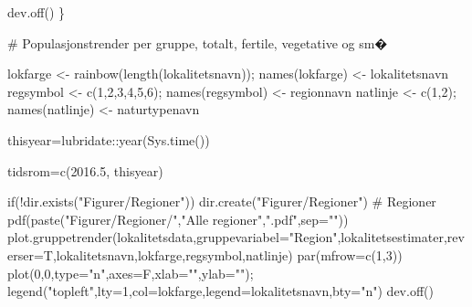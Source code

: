 \documentclass[
  letterpaper,
  DIV=11,
  numbers=noendperiod]{scrreport}
\newenvironment{Shaded}{\begin{snugshade}}{\end{snugshade}}
\newcommand{\AttributeTok}[1]{\textcolor[rgb]{0.40,0.45,0.13}{#1}}
\newcommand{\CommentTok}[1]{\textcolor[rgb]{0.37,0.37,0.37}{#1}}
\newcommand{\ControlFlowTok}[1]{\textcolor[rgb]{0.00,0.23,0.31}{#1}}
\newcommand{\DecValTok}[1]{\textcolor[rgb]{0.68,0.00,0.00}{#1}}
\newcommand{\FloatTok}[1]{\textcolor[rgb]{0.68,0.00,0.00}{#1}}
\newcommand{\FunctionTok}[1]{\textcolor[rgb]{0.28,0.35,0.67}{#1}}
\newcommand{\NormalTok}[1]{\textcolor[rgb]{0.00,0.23,0.31}{#1}}
\newcommand{\OtherTok}[1]{\textcolor[rgb]{0.00,0.23,0.31}{#1}}
\newcommand{\SpecialCharTok}[1]{\textcolor[rgb]{0.37,0.37,0.37}{#1}}
\newcommand{\StringTok}[1]{\textcolor[rgb]{0.13,0.47,0.30}{#1}}
\begin{document}
\begin{Shaded}
\begin{Highlighting}[]
    \FunctionTok{dev.off}\NormalTok{()}
\NormalTok{\}}


\CommentTok{\# Populasjonstrender per gruppe, totalt, fertile, vegetative og sm�}

\NormalTok{lokfarge }\OtherTok{\textless{}{-}} \FunctionTok{rainbow}\NormalTok{(}\FunctionTok{length}\NormalTok{(lokalitetsnavn)); }\FunctionTok{names}\NormalTok{(lokfarge) }\OtherTok{\textless{}{-}}\NormalTok{ lokalitetsnavn}
\NormalTok{regsymbol }\OtherTok{\textless{}{-}} \FunctionTok{c}\NormalTok{(}\DecValTok{1}\NormalTok{,}\DecValTok{2}\NormalTok{,}\DecValTok{3}\NormalTok{,}\DecValTok{4}\NormalTok{,}\DecValTok{5}\NormalTok{,}\DecValTok{6}\NormalTok{); }\FunctionTok{names}\NormalTok{(regsymbol) }\OtherTok{\textless{}{-}}\NormalTok{ regionnavn}
\NormalTok{natlinje }\OtherTok{\textless{}{-}} \FunctionTok{c}\NormalTok{(}\DecValTok{1}\NormalTok{,}\DecValTok{2}\NormalTok{); }\FunctionTok{names}\NormalTok{(natlinje) }\OtherTok{\textless{}{-}}\NormalTok{ naturtypenavn}

\NormalTok{thisyear}\OtherTok{=}\NormalTok{lubridate}\SpecialCharTok{::}\FunctionTok{year}\NormalTok{(}\FunctionTok{Sys.time}\NormalTok{())}

\NormalTok{tidsrom}\OtherTok{=}\FunctionTok{c}\NormalTok{(}\FloatTok{2016.5}\NormalTok{, thisyear)}

\ControlFlowTok{if}\NormalTok{(}\SpecialCharTok{!}\FunctionTok{dir.exists}\NormalTok{(}\StringTok{"Figurer/Regioner"}\NormalTok{)) }\FunctionTok{dir.create}\NormalTok{(}\StringTok{"Figurer/Regioner"}\NormalTok{)}
\CommentTok{\# Regioner}
\FunctionTok{pdf}\NormalTok{(}\FunctionTok{paste}\NormalTok{(}\StringTok{"Figurer/Regioner/"}\NormalTok{,}\StringTok{"Alle regioner"}\NormalTok{,}\StringTok{".pdf"}\NormalTok{,}\AttributeTok{sep=}\StringTok{""}\NormalTok{))}
\FunctionTok{plot.gruppetrender}\NormalTok{(lokalitetsdata,}\AttributeTok{gruppevariabel=}\StringTok{"Region"}\NormalTok{,lokalitetsestimater,}\AttributeTok{reverser=}\NormalTok{T,lokalitetsnavn,lokfarge,regsymbol,natlinje)}
\FunctionTok{par}\NormalTok{(}\AttributeTok{mfrow=}\FunctionTok{c}\NormalTok{(}\DecValTok{1}\NormalTok{,}\DecValTok{3}\NormalTok{))}
\FunctionTok{plot}\NormalTok{(}\DecValTok{0}\NormalTok{,}\DecValTok{0}\NormalTok{,}\AttributeTok{type=}\StringTok{"n"}\NormalTok{,}\AttributeTok{axes=}\NormalTok{F,}\AttributeTok{xlab=}\StringTok{""}\NormalTok{,}\AttributeTok{ylab=}\StringTok{""}\NormalTok{); }\FunctionTok{legend}\NormalTok{(}\StringTok{"topleft"}\NormalTok{,}\AttributeTok{lty=}\DecValTok{1}\NormalTok{,}\AttributeTok{col=}\NormalTok{lokfarge,}\AttributeTok{legend=}\NormalTok{lokalitetsnavn,}\AttributeTok{bty=}\StringTok{"n"}\NormalTok{)}
\FunctionTok{dev.off}\NormalTok{()}




\end{Highlighting}
\end{Shaded}
\end{document}
